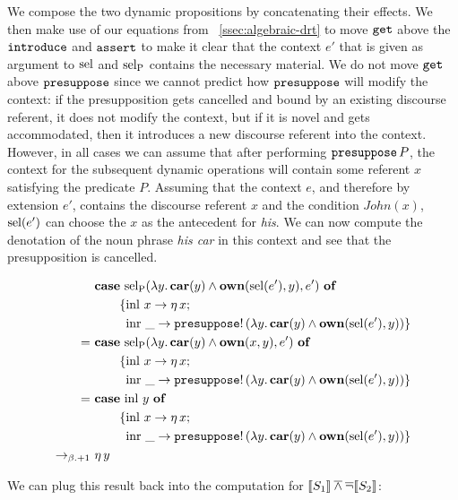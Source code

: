 We compose the two dynamic propositions by concatenating their effects. We
then make use of our equations from ~\ref{ssec:algebraic-drt} to move
$\mathtt{get}$ above the $\mathtt{introduce}$ and $\mathtt{assert}$ to make it clear
that the context $e'$ that is given as argument to $\operatorname{sel}$ and $\operatorname{sel_P}$
contains the necessary material. We do not move $\mathtt{get}$ above
$\mathtt{presuppose}$ since we cannot predict how $\mathtt{presuppose}$ will modify
the context: if the presupposition gets cancelled and bound by an existing
discourse referent, it does not modify the context, but if it is novel and
gets accommodated, then it introduces a new discourse referent into the
context. However, in all cases we can assume that after performing
$\mathtt{presuppose}\,P$, the context for the subsequent dynamic
operations will contain some referent $x$ satisfying the predicate
$P$. Assuming that the context $e$, and therefore by extension $e'$,
contains the discourse referent $x$ and the condition $John(x)$, $\operatorname{sel}(e')$
can choose the $x$ as the antecedent for \emph{his}. We can now compute the
denotation of the noun phrase \emph{his car} in this context and see that
the presupposition is cancelled.

\begin{align*}
  &\text{\textbf{case} $\operatorname{sel_P}(\lambda y.\, \textbf{car}(y) \land \textbf{own}(\operatorname{sel}(e'), y), e')$ \textbf{of}} \\ &\qquad \{\operatorname{inl}\,x \to \eta\,x; \\ &\qquad \ \operatorname{inr}\,\_ \to \mathtt{presuppose}!\,(\lambda y.\, \textbf{car}(y) \land \textbf{own}(\operatorname{sel}(e'), y)) \} \\
=\ &\text{\textbf{case} $\operatorname{sel_P}(\lambda y.\, \textbf{car}(y) \land \textbf{own}(x, y), e')$ \textbf{of}} \\ &\qquad \{\operatorname{inl}\,x \to \eta\,x; \\ &\qquad \ \operatorname{inr}\,\_ \to \mathtt{presuppose}!\,(\lambda y.\, \textbf{car}(y) \land \textbf{own}(\operatorname{sel}(e'), y)) \} \\
=\ &\text{\textbf{case} $\operatorname{inl}\,y$ \textbf{of}} \\ &\qquad \{\operatorname{inl}\,x \to \eta\,x; \\ &\qquad \ \operatorname{inr}\,\_ \to \mathtt{presuppose}!\,(\lambda y.\, \textbf{car}(y) \land \textbf{own}(\operatorname{sel}(e'), y)) \} \\
\to_{\beta.+1}\ &\eta\,y
\end{align*}

We can plug this result back into the computation for $\llbracket S_1 \rrbracket \mathbin{\overline{\land}}
\mathop{\overline{\lnot}} \llbracket S_2 \rrbracket$:

